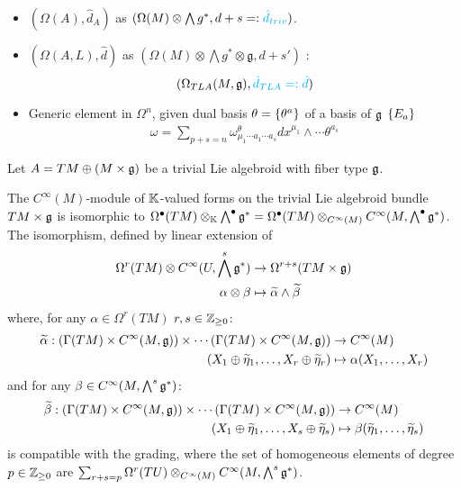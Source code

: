 \begin{itemize}
    
\item $(\Omega(A), \hat d_A)$ as $(\Omega(M)\otimes \bigwedge g^*, d + s =: \textcolor{cyan}{\hat d_{triv}})$.

\item $(\Omega(A, L), \hat d)$ as $(\Omega(M)\otimes \bigwedge g^* \otimes \mathfrak g, d + s')$ : \[(\Omega_{TLA}(M, \mathfrak g), \textcolor{cyan}{\hat d_{TLA} =: \hat d})\]

\item Generic element in $\Omega^n$, given dual basis $\theta = \left\{ \theta^a \right\}$ of a basis of $\mathfrak{g}$ $\left\{ E_a \right\}$
\begin{align*}
    \omega = \sum_{p + s = n} \omega^\theta_{\mu_1 \cdots a_1 \cdots a_s} dx^{\mu_1} \wedge \cdots \theta^{a_s}
\end{align*}
    
\end{itemize}

Let $A = TM \oplus (M \times \mathfrak{g})$ be a trivial Lie algebroid with fiber type $\mathfrak{g}$.

\begin{proposition}\label{propIsoScalarFormsTLA}
The $C^\infty(M)$-module of $\mathbb{K}$-valued forms on the trivial Lie algebroid bundle $TM \times \mathfrak{g}$ is isomorphic to $\Omega^\bullet(TM) \otimes_{\mathbb{K}} \bigwedge^\bullet \mathfrak{g}^* = \Omega^\bullet(TM) \otimes_{C^\infty(M)} C^\infty(M, \bigwedge^\bullet \mathfrak{g}^*)$. The isomorphism, defined by linear extension of
\begin{align*}
    \Omega^r(TM) \otimes C^\infty(U, \bigwedge^s \mathfrak{g}^*) &\to \Omega^{r+s}(TM \times \mathfrak{g})\\
    \alpha \otimes \beta &\mapsto \widetilde \alpha \wedge \widetilde \beta
\end{align*} where, for any $\alpha \in \Omega^r(TM)$ $r, s \in \mathbb{Z}_{\geq 0}$:
\begin{align*}
    \widetilde \alpha: (\Gamma(TM) \times C^\infty(M, \mathfrak{g})) \times \cdots (\Gamma(TM) \times C^\infty(M, \mathfrak{g})) &\to C^\infty(M) \\
    (X_1 \oplus \widetilde \eta_1, \dots, X_r \oplus \widetilde \eta_r) &\mapsto \alpha(X_1, \dots, X_r)
\end{align*} and for any $\beta \in C^\infty(M, \bigwedge^s \mathfrak{g}^*)$:
\begin{align*}
    \widetilde \beta: (\Gamma(TM) \times C^\infty(M, \mathfrak{g})) \times \cdots (\Gamma(TM) \times C^\infty(M, \mathfrak{g})) &\to C^\infty(M) \\
    (X_1 \oplus \widetilde \eta_1, \dots, X_s \oplus \widetilde \eta_s) &\mapsto \beta(\widetilde \eta_1, \dots, \widetilde \eta_s)
\end{align*}
is compatible with the grading, where the set of homogeneous elements of degree $p \in \mathbb{Z}_{\geq 0}$ are $\sum_{r + s = p} \Omega^r(TU) \otimes_{C^\infty(M)} C^\infty(M, \bigwedge^s \mathfrak{g}^*)$.
\end{proposition}


